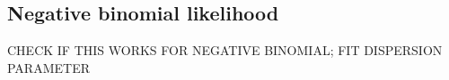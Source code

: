 \documentclass[12pt, oneside, titlepage]{article}   	%
\begin{document}




\subsection*{Negative binomial likelihood}
CHECK IF THIS WORKS FOR NEGATIVE BINOMIAL; FIT DISPERSION PARAMETER
\end{document}

